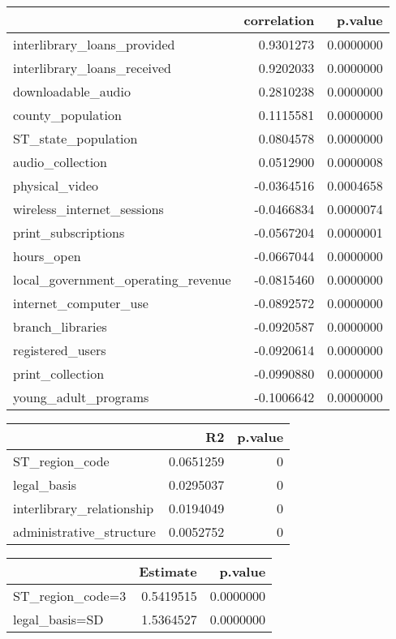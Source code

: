 \documentclass[14pt,]{article}
\begin{document}
\begin{table}
\begin{table}
\centering
\begin{tabular}[t]{l|r|r}
\hline
  & correlation & p.value\\
\hline
interlibrary\_loans\_provided & 0.9301273 & 0.0000000\\
\hline
interlibrary\_loans\_received & 0.9202033 & 0.0000000\\
\hline
downloadable\_audio & 0.2810238 & 0.0000000\\
\hline
county\_population & 0.1115581 & 0.0000000\\
\hline
ST\_state\_population & 0.0804578 & 0.0000000\\
\hline
audio\_collection & 0.0512900 & 0.0000008\\
\hline
physical\_video & -0.0364516 & 0.0004658\\
\hline
wireless\_internet\_sessions & -0.0466834 & 0.0000074\\
\hline
print\_subscriptions & -0.0567204 & 0.0000001\\
\hline
hours\_open & -0.0667044 & 0.0000000\\
\hline
local\_government\_operating\_revenue & -0.0815460 & 0.0000000\\
\hline
internet\_computer\_use & -0.0892572 & 0.0000000\\
\hline
branch\_libraries & -0.0920587 & 0.0000000\\
\hline
registered\_users & -0.0920614 & 0.0000000\\
\hline
print\_collection & -0.0990880 & 0.0000000\\
\hline
young\_adult\_programs & -0.1006642 & 0.0000000\\
\hline
\end{tabular}
\centering
\begin{tabular}[t]{l|r|r}
\hline
  & R2 & p.value\\
\hline
ST\_region\_code & 0.0651259 & 0\\
\hline
legal\_basis & 0.0295037 & 0\\
\hline
interlibrary\_relationship & 0.0194049 & 0\\
\hline
administrative\_structure & 0.0052752 & 0\\
\hline
\end{tabular}
\centering
\begin{tabular}[t]{l|r|r}
\hline
  & Estimate & p.value\\
\hline
ST\_region\_code=3 & 0.5419515 & 0.0000000\\
\hline
legal\_basis=SD & 1.5364527 & 0.0000000\\

\end{tabular}
\end{table}
\end{table}
\end{document}
